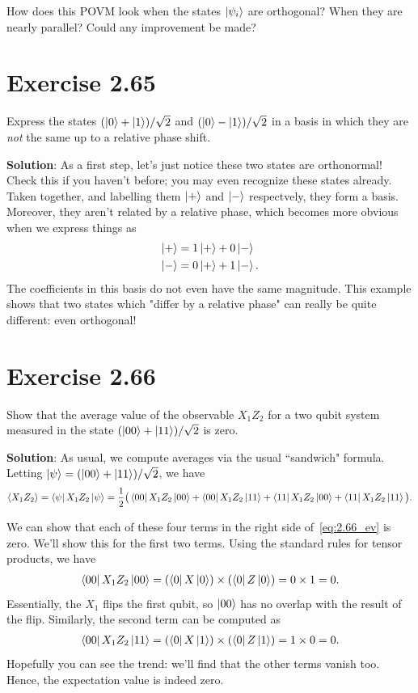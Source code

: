 \documentclass{book}
\begin{document}
    How does this POVM look when the states $\ket{\psi_i}$ are orthogonal? When they are nearly parallel? Could any improvement be made?

\section*{Exercise 2.65}
    Express the states $(\ket{0}+\ket{1})/\sqrt{2}$ and $(\ket{0}-\ket{1})/\sqrt{2}$ in a basis in which they are \emph{not} the same up to a relative phase shift.

    \textbf{Solution}: As a first step, let's just notice these two states are orthonormal! Check this if you haven't before; you may even recognize these states already. Taken together, and labelling them $\ket{+}$ and $\ket{-}$ respectvely, they form a basis. Moreover, they aren't related by a relative phase, which becomes more obvious when we express things as 
    \begin{align}
    \begin{aligned}
        \ket{+} &= 1\ket{+} + 0 \ket{-} \\
        \ket{-} &= 0\ket{+} + 1\ket{-}.
    \end{aligned}
    \end{align}
    The coefficients in this basis do not even have the same magnitude. This example shows that two states which "differ by a relative phase" can really be quite different: even orthogonal!

\section*{Exercise 2.66} 
    Show that the average value of the observable $X_1 Z_2$ for a two qubit system measured in the state $(\ket{00}+\ket{11})/\sqrt{2}$ is zero.

    \textbf{Solution}: As usual, we compute averages via the usual ``sandwich" formula. Letting $\ket{\psi}= (\ket{00}+\ket{11})/\sqrt{2}$, we have
    \begin{align} \label{eq:2.66_ev}
        \langle X_1 Z_2\rangle = \bra{\psi}X_1 Z_2 \ket{\psi} = \frac{1}{2}\big(\bra{00}X_1 Z_2 \ket{00} + \bra{00}X_1 Z_2 \ket{11} + \bra{11}X_1 Z_2 \ket{00} + \bra{11}X_1 Z_2 \ket{11}\big).
    \end{align}

    We can show that each of these four terms in the right side of~\eqref{eq:2.66_ev} is zero. We'll show this for the first two terms. Using the standard rules for tensor products, we have
    \begin{align}
        \bra{00}X_1 Z_2 \ket{00} = (\bra{0}X\ket{0})\times (\bra{0}Z\ket{0}) = 0 \times 1 = 0.
    \end{align}
    Essentially, the $X_1$ flips the first qubit, so $\ket{00}$ has no overlap with the result of the flip. Similarly, the second term can be computed as
    \begin{align}
        \bra{00}X_1 Z_2 \ket{11} = (\bra{0}X\ket{1})\times(\bra{0}Z\ket{1}) = 1 \times 0 = 0.
    \end{align}
    Hopefully you can see the trend: we'll find that the other terms vanish too. Hence, the expectation value is indeed zero.
\end{document}
